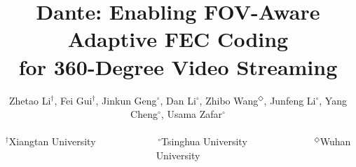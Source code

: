 \documentclass[sigconf,10pt]{acmart}
\begin{document}
	



\title{Dante: Enabling FOV-Aware Adaptive FEC Coding \\for 360-Degree Video Streaming}


\author{\large{
Zhetao Li$^{\dagger}$, Fei Gui$^{\dagger}$, Jinkun Geng$^{\circ}$, Dan Li$^{\circ}$, Zhibo Wang$^{\Diamond}$, Junfeng Li$^{\circ}$, Yang Cheng$^{\circ}$, Usama Zafar$^{\circ}$\\ \\
$^{\dagger}$Xiangtan University~~~~~~~~~~~~  $^{\circ}$Tsinghua University~~~~~~~~~~~~~  $^{\Diamond}$Wuhan University}}




\renewcommand{\shortauthors}{ F. Gui et al.}

\end{document}
